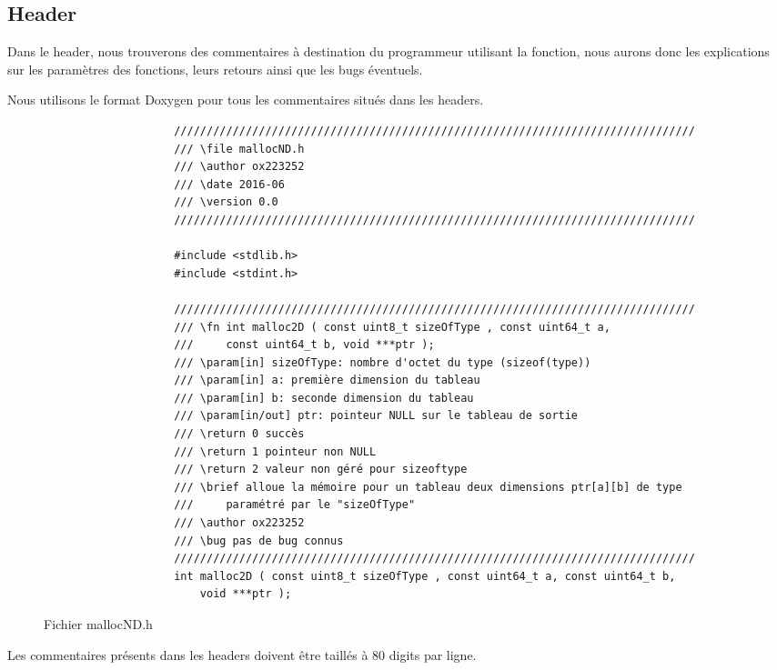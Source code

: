 			
		\subsection{Header}
			Dans le header, nous trouverons des commentaires à destination du programmeur utilisant la fonction, nous aurons donc les explications sur les paramètres des fonctions, leurs retours ainsi que les bugs éventuels.

			Nous utilisons le format Doxygen pour tous les commentaires situés dans les headers.

			\begin{figure}[H]
				\begin{changemargin}{-2.5cm}{-2.5cm}
				\begin{tcolorbox}
				\begin{verbatim}
					////////////////////////////////////////////////////////////////////////////////
					/// \file mallocND.h
					/// \author ox223252
					/// \date 2016-06
					/// \version 0.0
					////////////////////////////////////////////////////////////////////////////////

					#include <stdlib.h>
					#include <stdint.h>

					////////////////////////////////////////////////////////////////////////////////
					/// \fn int malloc2D ( const uint8_t sizeOfType , const uint64_t a,
					/// 	const uint64_t b, void ***ptr );
					/// \param[in] sizeOfType: nombre d'octet du type (sizeof(type))
					/// \param[in] a: première dimension du tableau
					/// \param[in] b: seconde dimension du tableau
					/// \param[in/out] ptr: pointeur NULL sur le tableau de sortie
					/// \return 0 succès
					/// \return 1 pointeur non NULL
					/// \return 2 valeur non géré pour sizeoftype
					/// \brief alloue la mémoire pour un tableau deux dimensions ptr[a][b] de type 
					/// 	paramétré par le "sizeOfType"
					/// \author ox223252
					/// \bug pas de bug connus
					////////////////////////////////////////////////////////////////////////////////
					int malloc2D ( const uint8_t sizeOfType , const uint64_t a, const uint64_t b, 
					    void ***ptr );
				\end{verbatim}
				\end{tcolorbox}
				\end{changemargin}
				\caption{Fichier mallocND.h}
			\end{figure}

			Les commentaires présents dans les headers doivent être taillés à 80 digits par ligne.
		
